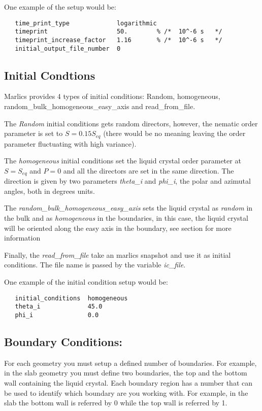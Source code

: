 \documentclass{article}
\begin{document}
One example of the setup would be:
\begin{lstlisting}
   time_print_type             logarithmic
   timeprint                   50.        % /*  10^-6 s   */
   timeprint_increase_factor   1.16       % /*  10^-6 s   */     
   initial_output_file_number  0	
\end{lstlisting}



\subsection{Initial Condtions}\label{ic.params}

Marlics provides 4 types of initial conditions: Random, homogeneous, random_bulk_homogeneous_easy_axis and read_from_file.

The \textit{Random} initial conditions gets random directors, however, the nematic order parameter is set to $S=0.15 S_{eq}$ (there would be no meaning leaving the order parameter fluctuating with high variance).

The \textit{homogeneous} initial conditions set the liquid crystal order parameter at $S=S_{eq}$ and $P=0$ and all the directors are set in the same direction. The direction is given by two parameters \textit{theta_i} and \textit{phi_i}, the polar and azimutal angles, both in degrees units.

The \textit{random_bulk_homogeneous_easy_axis} sets the liquid crystal as \textit{random} in the bulk and as \textit{homogeneous} in the boundaries, in this case, the liquid crystal will be oriented along the easy axis in the boundary, see section \label{ssec:boundary} for more information

Finally, the \textit{read_from_file} take an marlics snapshot and use it as initial conditions. The file name is passed by the variable \textit{ic_file}. 

One example of the initial condition setup would be:
\begin{lstlisting}
   initial_conditions  homogeneous
   theta_i             45.0
   phi_i               0.0	
\end{lstlisting}


\subsection{Boundary Conditions:}\label{boundary.params}

For each geometry you must setup a defined number of boundaries. For example, in the slab geometry you must define two boundaries, the top and the bottom wall containing the liquid crystal. Each boundary region has a number that can be used to identify which boundary are you working with. For example, in the slab the bottom wall is referred by 0 while the top wall is referred by 1.
\end{document}
